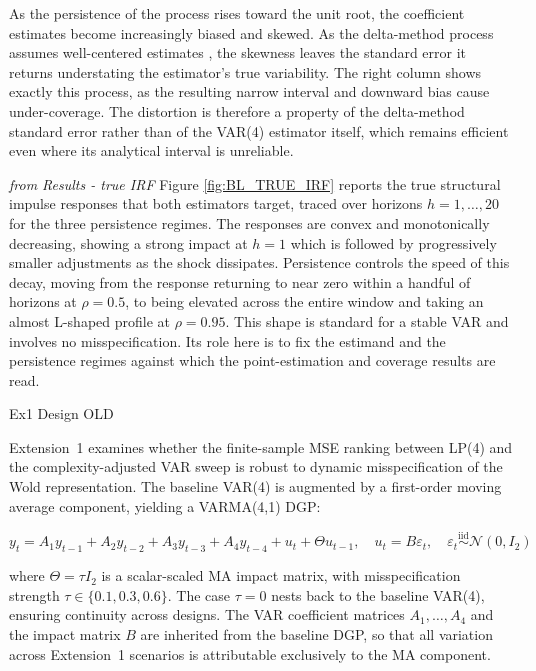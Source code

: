 As the persistence of the process rises toward the unit root, the coefficient estimates become increasingly biased 
and skewed. As the delta-method process assumes well-centered estimates \parencite{kilian1998small}, the skewness 
leaves the standard error it returns understating the estimator's true variability. The right column shows exactly 
this process, as the resulting narrow interval and downward bias cause under-coverage.
The distortion is therefore a property of the delta-method standard 
error rather than of the VAR(4) estimator itself, which remains efficient even where its analytical interval is 
unreliable.


\textit{from Results - true IRF}
Figure \ref{fig:BL_TRUE_IRF} reports the true structural impulse responses that both estimators target, traced over 
horizons $h = 1, \ldots, 20$ for the three persistence regimes. The responses are convex and monotonically decreasing, showing
a strong impact at $h = 1$ which is followed by progressively smaller adjustments as the shock dissipates. Persistence controls 
the speed of this decay, moving from the response returning to near zero within a handful of horizons at $\rho = 0.5$, to being 
elevated across the entire window and taking an almost L-shaped profile at $\rho = 0.95$. This shape is standard 
for a stable VAR and involves no misspecification. Its role here is to fix the estimand and the persistence regimes 
against which the point-estimation and coverage results are read.

Ex1 Design OLD

Extension~1 examines 
whether the finite-sample MSE ranking between LP(4) and the complexity-adjusted 
VAR sweep is robust to dynamic misspecification of the Wold representation. The 
baseline VAR(4) is augmented by a first-order moving average component, yielding 
a VARMA(4,1) DGP:

\begin{equation}
    y_t = A_1 y_{t-1} + A_2 y_{t-2} + A_3 y_{t-3} + A_4 y_{t-4} 
    + u_t + \Theta u_{t-1}, \quad u_t = B\varepsilon_t, \quad 
    \varepsilon_t \overset{\text{iid}}{\sim} \mathcal{N}(0, I_2)
\end{equation}

where $\Theta = \tau I_2$ is a scalar-scaled MA impact matrix, with 
misspecification strength $\tau \in \{0.1, 0.3, 0.6\}$. The case $\tau = 0$ 
nests back to the baseline VAR(4), ensuring continuity across designs. The VAR 
coefficient matrices $A_1, \ldots, A_4$ and the impact matrix $B$ are inherited 
from the baseline DGP, so that all variation across Extension~1 scenarios is 
attributable exclusively to the MA component.

